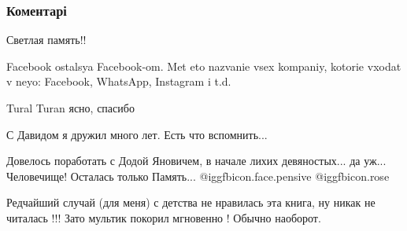  
 
 
 
 
\subsubsection{Коментарі}

\begin{itemize} %

Светлая память!!


Facebook ostalsya Facebook-om. Met eto nazvanie vsex kompaniy, kotorie vxodat v
neyo: Facebook, WhatsApp, Instagram i t.d.


Tural Turan ясно, спасибо


С Давидом я дружил много лет. Есть что вспомнить...


Довелось поработать с Додой Яновичем, в начале лихих девяностых... да уж...
Человечище! Осталась только Память...  @igg{fbicon.face.pensive}
@igg{fbicon.rose} 


Редчайший случай (для меня) с детства не нравилась эта книга, ну никак не
читалась !!! Зато мультик покорил мгновенно ! Обычно наоборот.

\end{itemize} %
